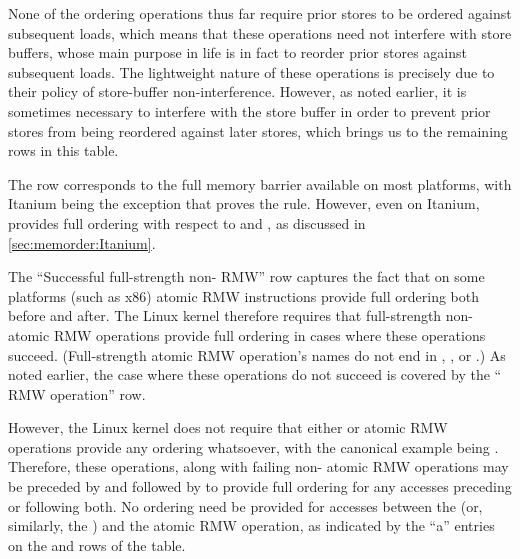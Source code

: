 {{	None of the ordering operations thus far require prior stores to be
	ordered against subsequent loads, which means that these operations
	need not interfere with store buffers, whose main purpose in life
	is in fact to reorder prior stores against subsequent loads.
	The lightweight nature of these operations is precisely due to
	their policy of store-buffer non-interference.
	However, as noted earlier, it is sometimes necessary to interfere
	with the store buffer in order to prevent prior stores from being
	reordered against later stores, which brings us to the remaining
	rows in this table.

	The  row corresponds to the full memory barrier
	available on most platforms, with Itanium being the exception
	that proves the rule.
	However, even on Itanium,  provides full ordering
	with respect to  and ,
	as discussed in \cref{sec:memorder:Itanium}.

	The ``Successful full-strength non- RMW'' row captures
	the fact that on some platforms (such as x86) atomic RMW instructions
	provide full ordering both before and after.
	The Linux kernel therefore requires that full-strength non-
	atomic RMW operations provide full ordering in cases where these
	operations succeed.
	(Full-strength atomic RMW operation's names do not end in
	, , or .)
	As noted earlier, the case where these operations do not succeed
	is covered by the `` RMW operation'' row.

	However, the Linux kernel does not require that either 
	or  atomic RMW operations provide any ordering
	whatsoever, with the canonical example being .
	Therefore, these operations, along with failing non-
	atomic RMW operations may be preceded by 
	and followed by  to provide full
	ordering for any accesses preceding or following both.
	No ordering need be provided for accesses between the
	 (or, similarly, the
	) and the atomic RMW operation, as
	indicated by the ``a'' entries on the 
	and  rows of the table.

}}
